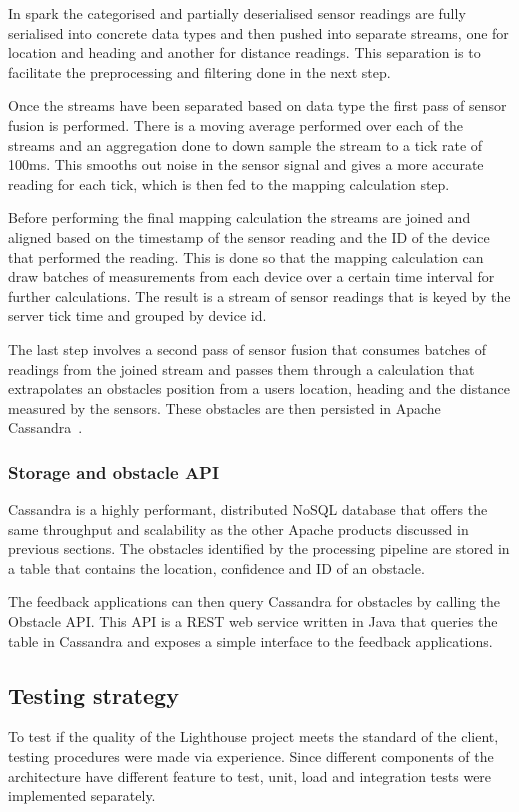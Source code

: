 \documentclass[prodmode,acmtosem]{acmsmall} %
\begin{document}
In spark the categorised and partially deserialised sensor readings are fully serialised into concrete data types and then pushed into separate streams, one for location and heading and another for distance readings. This separation is to facilitate the preprocessing and filtering done in the next step. 

Once the streams have been separated based on data type the first pass of sensor fusion is performed. There is a moving average performed over each of the streams and an aggregation done to down sample the stream to a tick rate of 100ms. This smooths out noise in the sensor signal and gives a more accurate reading for each tick, which is then fed to the mapping calculation step.

Before performing the final mapping calculation the streams are joined and aligned based on the timestamp of the sensor reading and the ID of the device that performed the reading. This is done so that the mapping calculation can draw batches of measurements from each device over a certain time interval for further calculations. The result is a stream of sensor readings that is keyed by the server tick time and grouped by device id.

The last step involves a second pass of sensor fusion that consumes batches of readings from the joined stream and passes them through a calculation that extrapolates an obstacles position from a users location, heading and the distance measured by the sensors. These obstacles are then persisted in Apache Cassandra~\cite{ApacheCassandra}.

\subsubsection{Storage and obstacle API}
Cassandra is a highly performant, distributed NoSQL database that offers the same throughput and scalability as the other Apache products discussed in previous sections. The obstacles identified by the processing pipeline are stored in a table that contains the location, confidence and ID of an obstacle.

The feedback applications can then query Cassandra for obstacles by calling the Obstacle API. This API is a REST web service written in Java that queries the table in Cassandra and exposes a simple interface to the feedback applications.
\subsection{Testing strategy}
To test if the quality of the Lighthouse project meets the standard of the client, testing procedures were made via experience. Since different components of the architecture have different feature to test, unit, load and integration tests were implemented separately.
\end{document}
